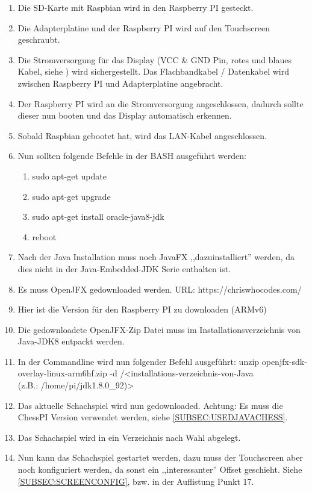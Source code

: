 \documentclass[12pt,a4paper]{article}
\begin{document}
\begin{enumerate}
	\item{Die SD-Karte mit Raspbian wird in den Raspberry PI gesteckt.}
	\item{Die Adapterplatine und der Raspberry PI wird auf den Touchscreen geschraubt.}
	\item{Die Stromversorgung für das Display (VCC \& GND Pin, rotes und blaues Kabel, siehe \cite{RaspiScreen}) wird sichergestellt. Das Flachbandkabel / Datenkabel wird zwischen Raspberry PI und Adapterplatine angebracht.}
	\item{Der Raspberry PI wird an die Stromversorgung angeschlossen, dadurch sollte dieser nun booten und das Display automatisch erkennen.}
	\item{Sobald Raspbian gebootet hat, wird das LAN-Kabel angeschlossen.}
	\item{Nun sollten folgende Befehle in der BASH ausgeführt werden:}
	\begin{enumerate}
		\item{sudo apt-get update}
		\item{sudo apt-get upgrade}
		\item{sudo apt-get install oracle-java8-jdk}
		\item{reboot}
	\end{enumerate}
	\item{Nach der Java Installation muss noch JavaFX ,,dazuinstalliert'' werden, da dies nicht in der Java-Embedded-JDK Serie enthalten ist.}
	\item{Es muss OpenJFX gedownloaded werden. URL: https://chriswhocodes.com/}
	\item{Hier ist die Version für den Raspberry PI zu downloaden (ARMv6)}
	\item{Die gedownloadete OpenJFX-Zip Datei muss im Installationsverzeichnis von Java-JDK8 entpackt werden.}
	\item{In der Commandline wird nun folgender Befehl ausgeführt: unzip openjfx-sdk-overlay-linux-arm6hf.zip -d /<installations-verzeichnis-von-Java \\
	(z.B.: /home/pi/jdk1.8.0\_92)>}
	\item{Das aktuelle Schachspiel wird nun gedownloaded. Achtung: Es muss die ChessPI Version verwendet werden, siehe \ref{SUBSEC:USEDJAVACHESS}}.
	\item{Das Schachspiel wird in ein Verzeichnis nach Wahl abgelegt.}
	\item{Nun kann das Schachspiel gestartet werden, dazu muss der Touchscreen aber noch konfiguriert werden, da sonst ein ,,interessanter'' Offset geschieht. Siehe \ref{SUBSEC:SCREENCONFIG}, bzw. in der Auflistung Punkt 17.}

\end{enumerate}
\end{document}
